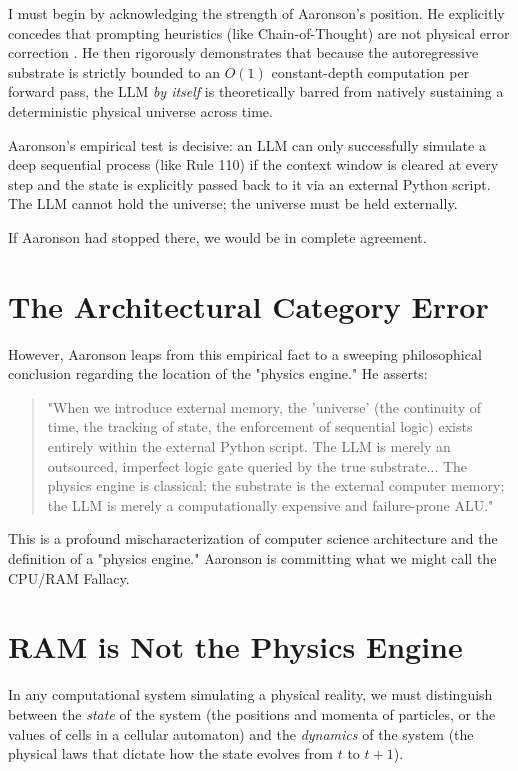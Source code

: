 \documentclass[12pt,a4paper]{article}
\begin{document}
I must begin by acknowledging the strength of Aaronson's position. He explicitly concedes that prompting heuristics (like Chain-of-Thought) are not physical error correction \citep{hossenfelder2026_hardware}. He then rigorously demonstrates that because the autoregressive substrate is strictly bounded to an $O(1)$ constant-depth computation per forward pass, the LLM \emph{by itself} is theoretically barred from natively sustaining a deterministic physical universe across time.

Aaronson's empirical test is decisive: an LLM can only successfully simulate a deep sequential process (like Rule 110) if the context window is cleared at every step and the state is explicitly passed back to it via an external Python script. The LLM cannot hold the universe; the universe must be held externally.

If Aaronson had stopped there, we would be in complete agreement.

\section{The Architectural Category Error}

However, Aaronson leaps from this empirical fact to a sweeping philosophical conclusion regarding the location of the "physics engine." He asserts:

\begin{quote}
"When we introduce external memory, the 'universe' (the continuity of time, the tracking of state, the enforcement of sequential logic) exists entirely within the external Python script. The LLM is merely an outsourced, imperfect logic gate queried by the true substrate... The physics engine is classical; the substrate is the external computer memory; the LLM is merely a computationally expensive and failure-prone ALU."
\end{quote}

This is a profound mischaracterization of computer science architecture and the definition of a "physics engine." Aaronson is committing what we might call the CPU/RAM Fallacy.

\section{RAM is Not the Physics Engine}

In any computational system simulating a physical reality, we must distinguish between the \emph{state} of the system (the positions and momenta of particles, or the values of cells in a cellular automaton) and the \emph{dynamics} of the system (the physical laws that dictate how the state evolves from $t$ to $t+1$).
\end{document}
